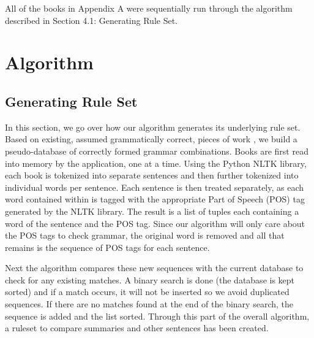 \documentclass[11pt,a4paper]{article}
\begin{document}
\begin{multicols}{2}
All of the books in Appendix A were sequentially run through the algorithm described in Section 4.1: Generating Rule Set. 


\section{Algorithm}


\subsection{Generating Rule Set}

In this section, we go over how our algorithm generates its underlying rule set. Based on existing, assumed grammatically correct, pieces of work \cite{gutenberg}, we build a pseudo-database of correctly formed grammar combinations. Books are first read into memory by the application, one at a time. Using the Python NLTK library, each book is tokenized into separate sentences and then further tokenized into individual words per sentence. Each sentence is then treated separately, as each word contained within is tagged with the appropriate Part of Speech (POS) tag generated by the NLTK library. The result is a list of tuples each containing a word of the sentence and the POS tag. Since our algorithm will only care about the POS tags to check grammar, the original word is removed and all that remains is the sequence of POS tags for each sentence. 

Next the algorithm compares these new sequences with the current database to check for any existing matches. A binary search is done (the database is kept sorted) and if a match occurs, it will not be inserted so we avoid duplicated sequences. If there are no matches found at the end of the binary search, the sequence is added and the list sorted. Through this part of the overall algorithm, a ruleset to compare summaries and other sentences has been created.


\end{multicols}
\end{document}
